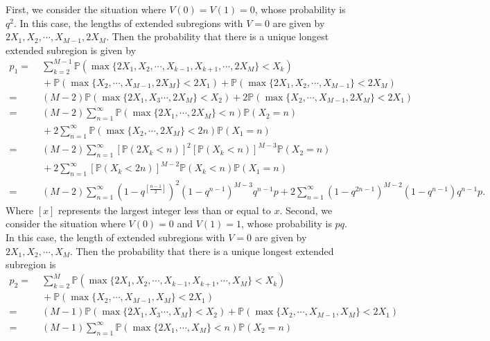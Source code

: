 \documentclass[a4paper,11pt]{article}
\begin{document}
\begin{appendices}
First, we consider the situation where $V(0) = V(1) = 0$, whose probability is $q^2$. In this case, the lengths of extended subregions with $V = 0$ are given by $2 X_1, X_2, \cdots, X_{M-1}, 2 X_M$. Then the probability that there is a unique longest extended subregion is given by
\begin{equation*}
\begin{split}
p_1 = &\; \sum_{k=2}^{M-1} \mathbb{P}(\max\{2 X_1, X_2, \cdots, X_{k-1}, X_{k+1}, \cdots, 2 X_{M}\} < X_k) \\
&\; + \mathbb{P}(\max\{X_2, \cdots, X_{M-1}, 2 X_M\} < 2 X_1) + \mathbb{P}(\max\{2 X_1, X_2, \cdots, X_{M-1}\} < 2 X_M) \\
= &\; (M-2) \mathbb{P}(\max\{2 X_1, X_3 \cdots, 2 X_{M}\} < X_2) + 2 \mathbb{P}(\max\{X_2, \cdots, X_{M-1}, 2 X_M\} < 2 X_1) \\
= &\; (M-2) \sum_{n=1}^{\infty} \mathbb{P}(\max\{2 X_1, \cdots, 2 X_{M}\} < n) \mathbb{P}(X_2 = n) \\
&\; + 2 \sum_{n=1}^{\infty} \mathbb{P}(\max\{X_2, \cdots, 2 X_M\} < 2 n) \mathbb{P}(X_1 = n) \\
= &\; (M-2) \sum_{n=1}^{\infty} [\mathbb{P}(2 X_k < n)]^2 [\mathbb{P}(X_k < n)]^{M-3} \mathbb{P}(X_2 = n) \\
&\; + 2 \sum_{n=1}^{\infty} [\mathbb{P}(X_k < 2 n)]^{M-2} \mathbb{P}(X_k < n) \mathbb{P}(X_1 = n) \\
= &\; (M-2) \sum_{n=1}^{\infty} (1 - q^{[\frac{n-1}{2}]})^2 (1 - q^{n-1})^{M-3} q^{n-1} p + 2 \sum_{n=1}^{\infty} (1 - q^{2n-1})^{M-2} (1 - q^{n-1}) q^{n-1} p.
\end{split}
\end{equation*}
Where $[x]$ represents the largest integer less than or equal to $x$. Second, we consider the situation where $V(0) = 0$ and $V(1) = 1$, whose probability is $p q$. In this case, the length of extended subregions with $V = 0$ are given by $2 X_1, X_2, \cdots, X_M$. Then the probability that there is a unique longest extended subregion is
\begin{equation*}
\begin{split}
p_2 = &\; \sum_{k=2}^{M} \mathbb{P}(\max\{2 X_1, X_2, \cdots, X_{k-1}, X_{k+1}, \cdots, X_{M}\} < X_k) \\
&\; + \mathbb{P}(\max\{X_2, \cdots, X_{M-1}, X_M\} < 2 X_1) \\
= &\; (M-1) \mathbb{P}(\max\{2 X_1, X_3 \cdots, X_{M}\} < X_2) + \mathbb{P}(\max\{X_2, \cdots, X_{M-1}, X_M\} < 2 X_1) \\
= &\; (M-1) \sum_{n=1}^{\infty} \mathbb{P}(\max\{2 X_1, \cdots, X_{M}\} < n) \mathbb{P}(X_2 = n) \\

\end{split}
\end{equation*}
\end{appendices}
\end{document}
